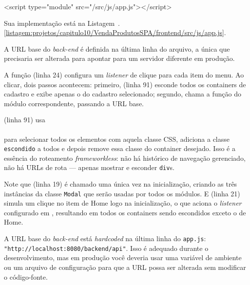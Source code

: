 \begin{boxHTMLCode}
<script type="module" src="/src/js/app.js"></script>
\end{boxHTMLCode}

Sua implementação está na Listagem~\thechapter.\ref{listagem:projetos/capitulo10/VendaProdutosSPA/frontend/src/js/app.js}.


A URL base do \textit{back-end} é definida na última linha do arquivo, a única que precisaria ser alterada para apontar para um servidor diferente em produção.

A função  (linha 24) configura um \textit{listener} de clique para cada item do menu. Ao clicar, dois passos acontecem: primeiro,  (linha 91) esconde todos os containers de cadastro e exibe apenas o do cadastro selecionado; segundo, chama a função  do módulo correspondente, passando a URL base.

 (linha 91) usa\\ \\para selecionar todos os elementos com aquela classe CSS, adiciona a classe \texttt{escondido} a todos e depois remove essa classe do container desejado. Isso é a essência do roteamento \textit{frameworkless}: não há histórico de navegação gerenciado, não há URLs de rota --- apenas mostrar e esconder \texttt{div}s.

Note que  (linha 19) é chamado uma única vez na inicialização, criando as três instâncias da classe \texttt{Modal} que serão usadas por todos os módulos. E  (linha 21) simula um clique no item de Home logo na inicialização, o que aciona o \textit{listener} configurado em , resultando em todos os containers sendo escondidos exceto o de Home.

\begin{atencao}
    A URL base do \textit{back-end} está \textit{hardcoded} na última linha do \texttt{app.js}: \texttt{"http://localhost:8080/backend/api"}. Isso é adequado durante o desenvolvimento, mas em produção você deveria usar uma variável de ambiente ou um arquivo de configuração para que a URL possa ser alterada sem modificar o código-fonte.
\end{atencao}


